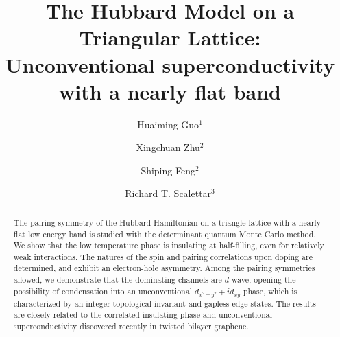 \documentclass[%
 reprint,
 amsmath,amssymb,
 aps,
]{revtex4-1}
\begin{document}

\title{The Hubbard Model on a Triangular Lattice: \\
Unconventional superconductivity with a nearly flat band}%

\author{Huaiming Guo$^{1}$}
\author{Xingchuan Zhu$^{2}$}
\author{Shiping Feng$^{2}$}
\author{Richard T. Scalettar$^{3}$}








\begin{abstract}
The pairing symmetry of the Hubbard Hamiltonian on a triangle lattice
with a nearly-flat low energy band is studied with the determinant
quantum Monte Carlo method.  We show that the low temperature phase is
insulating at half-filling, even for relatively weak interactions.  The
natures of the spin and pairing correlations upon doping are determined,
and exhibit an electron-hole asymmetry.  Among the pairing symmetries
allowed, we demonstrate that the dominating channels are $d$-wave,
opening the possibility of condensation into an unconventional
$d_{x^2-y^2}+id_{xy}$ phase, which is characterized by an integer
topological invariant and gapless edge states. The results are closely
related to the correlated insulating phase and unconventional
superconductivity discovered recently in twisted bilayer graphene.
\end{abstract}


\maketitle
\end{document}
